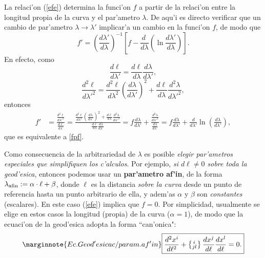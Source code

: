 La relaci'on (\ref{efe}) determina la funci'on $f$ a partir de la relaci'on
entre la longitud propia de la curva y el par'ametro $\lambda$. De aqu'i es
directo verificar que un cambio de par'ametro $\lambda\to\lambda'$ implicar'a
un cambio en la funci'on $f$, de modo que
\begin{equation}\label{fpf}
f'=\left(\frac{d\lambda'}{d\lambda}\right)^{-1}\left[f-\frac{d\ }{d\lambda}\left(\ln\frac{d\lambda'}{d\lambda}\right)\right] .
\end{equation}
En efecto, como
\begin{equation}
\frac{d\ell}{d\lambda'}=\frac{d\ell}{d\lambda}\frac{d\lambda}{d\lambda'},
\end{equation}
\begin{equation}
\frac{d^2\ell}{d\lambda'^2}=\frac{d^2\ell}{d\lambda^2}\left(\frac{d\lambda}{d\lambda'}\right)^2+\frac{d\ell}{d\lambda}\frac{d^2\lambda}{d\lambda'^2},
\end{equation}
entonces
\begin{align}
f'&=\frac{\frac{d^2\ell}{d\lambda'^2}}{\frac{d\ell}{d\lambda'}} = \frac{\frac{d^2\ell}{d\lambda^2}\left(\frac{d\lambda}{d\lambda'}\right)^2+\frac{d\ell}{d\lambda}\frac{d^2\lambda}{d\lambda'^2}}{\frac{d\ell}{d\lambda}\frac{d\lambda}{d\lambda'}} =f\frac{d\lambda}{d\lambda'}+\frac{\frac{d^2\lambda}{d\lambda'^2}}{\frac{d\lambda}{d\lambda'}}
=f\frac{d\lambda}{d\lambda'}+\frac{d}{d\lambda'}\ln\left(\frac{d\lambda}{d\lambda'}\right),
\end{align}
que es equivalente a \eqref{fpf}.

Como consecuencia de la arbitrariedad de $\lambda$ es posible \textit{elegir par'ametros especiales que simplifiquen los c'alculos}. Por ejemplo, \textit{si $d\ell\neq 0$ sobre toda la geod'esica}, entonces podemos usar un \textbf{par'ametro af'in}, de la forma $\lambda_{\rm afin}:=\alpha\cdot \ell+\beta$, donde $\ell$ es la distancia \textit{sobre la curva} desde un punto de referencia hasta un punto arbitrario de ella, y adem'as $\alpha$ y $\beta$ son \textit{constantes} (escalares). En este caso (\ref{efe}) implica que $f=0$. Por simplicidad, usualmente se elige en estos casos la longitud (propia) de la curva ($\alpha=1$), de modo que la ecuaci'on de la geod'esica adopta la forma ``can'onica":
\begin{equation}\marginnote{Ec. Geod'esica c/param. af'in}
\boxed{\frac{d^2x^i }{d\ell^2}+\left\{ _{ j l}^{\, i}\right\}
\frac{dx^j }{d\ell}\frac{dx^{ l}}{d\ell}=0.} \label{gm7}%
\end{equation}

